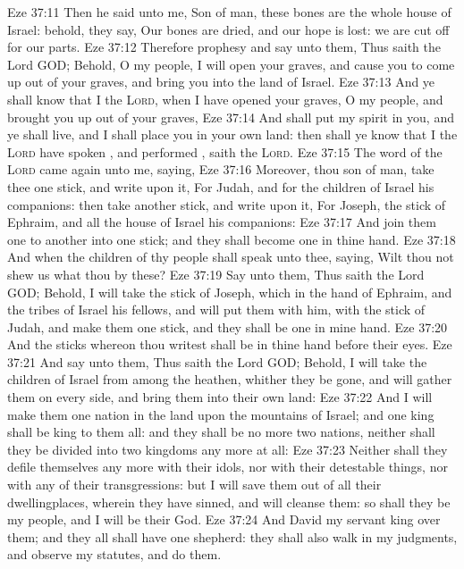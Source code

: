 \vs Eze 37:11 Then he said unto me, Son of man, these bones are the whole house of Israel: behold, they say, Our bones are dried, and our hope is lost: we are cut off for our parts.
\vs Eze 37:12 Therefore prophesy and say unto them, Thus saith the Lord GOD; Behold, O my people, I will open your graves, and cause you to come up out of your graves, and bring you into the land of Israel.
\vs Eze 37:13 And ye shall know that I  the \textsc{Lord}, when I have opened your graves, O my people, and brought you up out of your graves,
\vs Eze 37:14 And shall put my spirit in you, and ye shall live, and I shall place you in your own land: then shall ye know that I the \textsc{Lord} have spoken , and performed , saith the \textsc{Lord}.
\vs Eze 37:15 The word of the \textsc{Lord} came again unto me, saying,
\vs Eze 37:16 Moreover, thou son of man, take thee one stick, and write upon it, For Judah, and for the children of Israel his companions: then take another stick, and write upon it, For Joseph, the stick of Ephraim, and  all the house of Israel his companions:
\vs Eze 37:17 And join them one to another into one stick; and they shall become one in thine hand.
\vs Eze 37:18 And when the children of thy people shall speak unto thee, saying, Wilt thou not shew us what thou  by these?
\vs Eze 37:19 Say unto them, Thus saith the Lord GOD; Behold, I will take the stick of Joseph, which  in the hand of Ephraim, and the tribes of Israel his fellows, and will put them with him,  with the stick of Judah, and make them one stick, and they shall be one in mine hand.
\vs Eze 37:20 And the sticks whereon thou writest shall be in thine hand before their eyes.
\vs Eze 37:21 And say unto them, Thus saith the Lord GOD; Behold, I will take the children of Israel from among the heathen, whither they be gone, and will gather them on every side, and bring them into their own land:
\vs Eze 37:22 And I will make them one nation in the land upon the mountains of Israel; and one king shall be king to them all: and they shall be no more two nations, neither shall they be divided into two kingdoms any more at all:
\vs Eze 37:23 Neither shall they defile themselves any more with their idols, nor with their detestable things, nor with any of their transgressions: but I will save them out of all their dwellingplaces, wherein they have sinned, and will cleanse them: so shall they be my people, and I will be their God.
\vs Eze 37:24 And David my servant  king over them; and they all shall have one shepherd: they shall also walk in my judgments, and observe my statutes, and do them.
